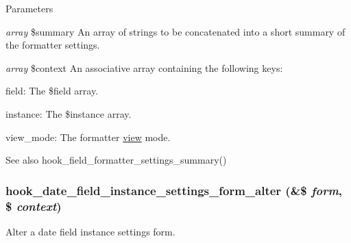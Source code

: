 \begin{DoxyParams}{Parameters}
\item[{\em array}]\$summary An array of strings to be concatenated into a short summary of the formatter settings. \item[{\em array}]\$context An associative array containing the following keys:
\begin{DoxyItemize}
\item field: The \$field array.
\item instance: The \$instance array.
\item view\_\-mode: The formatter \hyperlink{classview}{view} mode.
\end{DoxyItemize}\end{DoxyParams}
\begin{DoxySeeAlso}{See also}
hook\_\-field\_\-formatter\_\-settings\_\-summary() 
\end{DoxySeeAlso}
\hypertarget{date_8api_8php_a4dcd88abb62128ef8e63f5d2163f46b3}{
\subsubsection[{hook\_\-date\_\-field\_\-instance\_\-settings\_\-form\_\-alter}]{\setlength{\rightskip}{0pt plus 5cm}hook\_\-date\_\-field\_\-instance\_\-settings\_\-form\_\-alter (\&\$ {\em form}, \/  \$ {\em context})}}
\label{date_8api_8php_a4dcd88abb62128ef8e63f5d2163f46b3}
Alter a date field instance settings form.


